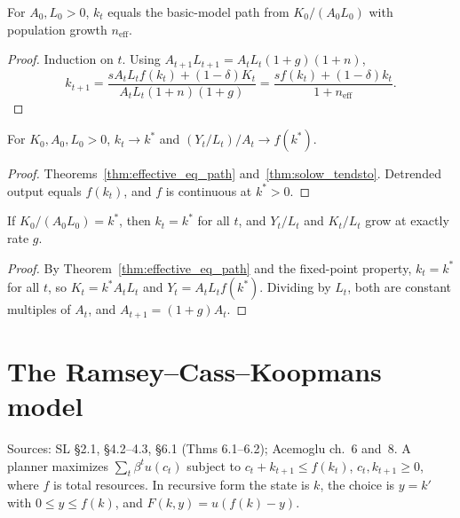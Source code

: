 \begin{theorem}
\label{thm:effective_eq_path}
\leanok
{}
For $A_0, L_0 > 0$, $k_t$ equals the basic-model path from $K_0/(A_0 L_0)$ with population growth $n_{\mathrm{eff}}$.
\end{theorem}
\begin{proof}
\leanok
Induction on $t$. Using $A_{t+1} L_{t+1} = A_t L_t (1 + g)(1 + n)$,
\[
  k_{t+1} = \frac{s A_t L_t f(k_t) + (1 - \delta) K_t}{A_t L_t (1 + n)(1 + g)}
          = \frac{s f(k_t) + (1 - \delta) k_t}{1 + n_{\mathrm{eff}}}.
\]
\end{proof}

\begin{theorem}
\label{thm:tech_tendsto}
\leanok
{}
For $K_0, A_0, L_0 > 0$, $k_t \to k^*$ and $(Y_t / L_t)/A_t \to f(k^*)$.
\end{theorem}
\begin{proof}
\leanok
Theorems~\ref{thm:effective_eq_path} and~\ref{thm:solow_tendsto}. Detrended output equals $f(k_t)$, and $f$ is
continuous at $k^* > 0$.
\end{proof}

\begin{theorem}
\label{thm:balanced_growth}
\leanok
{}
If $K_0/(A_0 L_0) = k^*$, then $k_t = k^*$ for all $t$, and $Y_t/L_t$ and $K_t/L_t$ grow at exactly rate $g$.
\end{theorem}
\begin{proof}
\leanok
By Theorem~\ref{thm:effective_eq_path} and the fixed-point property, $k_t = k^*$ for all $t$, so
$K_t = k^* A_t L_t$ and $Y_t = A_t L_t f(k^*)$. Dividing by $L_t$, both are constant multiples of $A_t$, and
$A_{t+1} = (1 + g) A_t$.
\end{proof}

\section{The Ramsey--Cass--Koopmans model}
\label{sec:ramsey}

Sources: SL \S2.1, \S4.2--4.3, \S6.1 (Thms 6.1--6.2); Acemoglu ch.~6 and~8. A planner maximizes
$\sum_t \beta^t u(c_t)$ subject to $c_t + k_{t+1} \le f(k_t)$, $c_t, k_{t+1} \ge 0$, where $f$ is total resources.
In recursive form the state is $k$, the choice is $y = k'$ with $0 \le y \le f(k)$, and $F(k, y) = u(f(k) - y)$.

